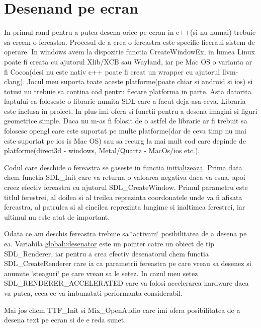 \hypertarget{group__group__deseneaza__pe__ecran}{}\section{Desenand pe ecran}
\label{group__group__deseneaza__pe__ecran}
In primul rand pentru a putea desena orice pe ecran in c++(si nu numai) trebuie sa creem o fereastra. Procesul de a crea o fereastra este specific fiecraui sistem de operare. In windows avem la dispozitie functia Create\+Window\+Ex, in lumea Linux poate fi creata cu ajutorul Xlib/\+X\+CB sau Wayland, iar pe Mac OS o varianta ar fi Cocoa(desi nu este nativ c++ poate fi creat un wrapper cu ajutorul llvm-\/clang). Jocul meu suporta toate aceste platforme(poate chiar si android si ios) si totusi nu trebuie sa contina cod pentru fiecare platforma in parte. Asta datorita faptului ca foloseste o librarie numita S\+DL care a facut deja asa ceva. Libraria este inclusa in proiect. In plus imi ofera si functii pentru a desena imagini si figuri geometrice simple. Daca nu m-\/as fi folosit de o astfel de librarie ar fi trebuit sa folosesc opengl care este suportat pe multe platforme(dar de ceva timp nu mai este suportat pe ios is Mac O\+S) sau sa recurg la mai mult cod care depinde de platforme(direct3d -\/ windows, Metal/\+Quartz -\/ Mac\+Os/ios etc.).

Codul care deschide o fereastra se gaseste in functia \hyperlink{main_8cpp_a81cdc1223b468897943076b72f048133}{initializeaza}. Prima data chem functia S\+D\+L\+\_\+\+Init care va returna o valoarea negativa daca va esua, apoi creez efectiv fereastra cu ajutorul S\+D\+L\+\_\+\+Create\+Window. Primul parametru este titlul ferestrei, al doilea si al treilea reprezinta coordonatele unde va fi afisata fereastra, al patrulea si al cincilea reprezinta lungime si inaltimea ferestrei, iar ultimul nu este atat de important.

Odata ce am deschis fereastra trebuie sa \char`\"{}activam\char`\"{} posibilitatea de a desena pe ea. Variabila \hyperlink{namespaceglobal_ae80ab1c7d78e562614d35c3b78e44ea3}{global\+::desenator} este un pointer catre un obiect de tip S\+D\+L\+\_\+\+Renderer, iar pentru a crea efectiv desenatorul chem functia S\+D\+L\+\_\+\+Create\+Renderer care ia ca parametrii fereastra pe care vreau sa desenez si anumite \char`\"{}steaguri\char`\"{} pe care vreau sa le setez. In cazul meu setez S\+D\+L\+\_\+\+R\+E\+N\+D\+E\+R\+E\+R\+\_\+\+A\+C\+C\+E\+L\+E\+R\+A\+T\+ED care va folosi accelerarea hardware daca va putea, ceea ce va imbunatati performanta considerabil.

Mai jos chem T\+T\+F\+\_\+\+Init si Mix\+\_\+\+Open\+Audio care imi ofera posibilitatea de a desena text pe ecran si de e reda sunet. 